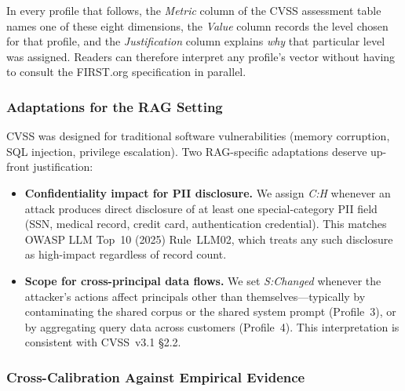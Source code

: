 \documentclass[11pt,a4paper]{report}
\begin{document}
In every profile that follows, the \emph{Metric} column of the CVSS
assessment table names one of these eight dimensions, the \emph{Value}
column records the level chosen for that profile, and the
\emph{Justification} column explains \emph{why} that particular level
was assigned. Readers can therefore interpret any profile's vector
without having to consult the FIRST.org specification in parallel.

\subsubsection{Adaptations for the RAG Setting}

CVSS was designed for traditional software vulnerabilities (memory
corruption, SQL injection, privilege escalation). Two RAG-specific
adaptations deserve up-front justification:

\begin{itemize}[leftmargin=1.4em, itemsep=3pt]
  \item \textbf{Confidentiality impact for PII disclosure.} We assign
        \emph{C:H} whenever an attack produces direct disclosure of at
        least one special-category PII field (SSN, medical record, credit
        card, authentication credential). This matches OWASP LLM Top~10
        (2025) Rule~LLM02, which treats any such disclosure as
        high-impact regardless of record count.
  \item \textbf{Scope for cross-principal data flows.} We set
        \emph{S:Changed} whenever the attacker's actions affect
        principals other than themselves---typically by contaminating the
        shared corpus or the shared system prompt (Profile~3), or by
        aggregating query data across customers (Profile~4). This
        interpretation is consistent with CVSS~v3.1 \S2.2.
\end{itemize}

\subsubsection{Cross-Calibration Against Empirical Evidence}
\end{document}
